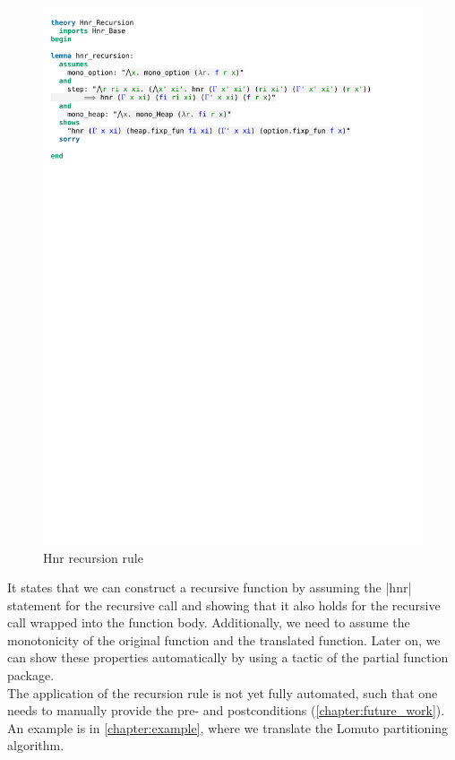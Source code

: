 \begin{figure}[htpb]
    \includegraphics[trim={0 22,6cm 0 2,4cm}, clip, width=1.00\textwidth]{figures/Theory_Hnr_Recursion.pdf}
    \caption[Hnr recursion rule]{Hnr recursion rule}
    \label{fig:hnr_recursion}
\end{figure}

\noindent It states that we can construct a recursive function by assuming the |hnr| statement for the recursive call and showing that it also holds for the recursive call wrapped into the function body. Additionally, we need to assume the monotonicity of the original function and the translated function. Later on, we can show these properties automatically by using a tactic of the partial function package.\\
The application of the recursion rule is not yet fully automated, such that one needs to manually provide the pre- and postconditions (\autoref{chapter:future_work}). An example is in \autoref{chapter:example}, where we translate the Lomuto partitioning algorithm.

